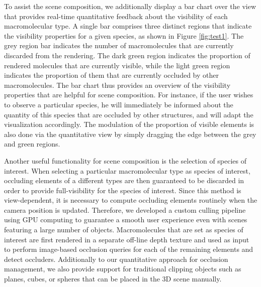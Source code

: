 To assist the scene composition, we additionally display a bar chart over the view that provides real-time quantitative feedback about the visibility of each macromolecular type.
A single bar comprises three distinct regions that indicate the visibility properties for a given species, as shown in Figure \ref{fig:test1}.
The grey region bar indicates the number of macromolecules that are currently discarded from the rendering.
The dark green region indicates the proportion of rendered molecules that are currently visible, while the light green region indicates the proportion of them that are currently occluded by other macromolecules.
The bar chart thus provides an overview of the visibility properties that are helpful for scene composition.
For instance, if the user wishes to observe a particular species, he will immediately be informed about the quantity of this species that are occluded by other structures, and will adapt the visualization accordingly.
The modulation of the proportion of visible elements is also done via the quantitative view by simply dragging the edge between the grey and green regions.

Another useful functionality for scene composition is the selection of species of interest.
When selecting a particular macromolecular type as species of interest, occluding elements of a different types are then guaranteed to be discarded in order to provide full-visibility for the species of interest.
Since this method is view-dependent, it is necessary to compute occluding elements routinely when the camera position is updated.
Therefore, we developed a custom culling pipeline using GPU computing to guarantee a smooth user experience even with scenes featuring a large number of objects.
Macromolecules that are set as species of interest are first rendered in a separate off-line depth texture and used as input to perform image-based occlusion queries for each of the remaining elements and detect occluders.
Additionally to our quantitative approach for occlusion management, we also provide support for traditional clipping objects such as planes, cubes, or spheres that can be placed in the 3D scene manually.


